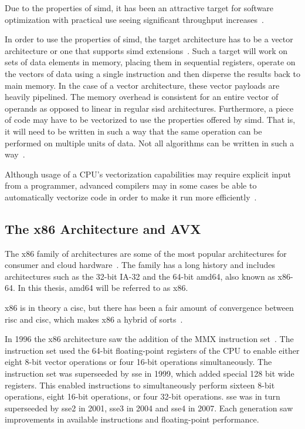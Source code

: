 \noindent Due to the properties of \gls{simd}, it has been an attractive target for software optimization with practical use seeing significant throughput increases~\cite{dickson2011}.

In order to use the properties of \gls{simd}, the target architecture has to be a vector architecture or one that supports \gls{simd} extensions~\cite{hennessy2011:vectorization}. Such a target will work on sets of data elements in memory, placing them in sequential registers, operate on the vectors of data using a single instruction and then disperse the results back to main memory. In the case of a vector architecture, these vector payloads are heavily pipelined. The memory overhead is consistent for an entire vector of operands as opposed to linear in regular \gls{sisd} architectures. Furthermore, a piece of code may have to be vectorized to use the properties offered by \gls{simd}. That is, it will need to be written in such a way that the same operation can be performed on multiple units of data. Not all algorithms can be written in such a way~\cite{dickson2011}.

Although usage of a CPU's vectorization capabilities may require explicit input from a programmer, advanced compilers may in some cases be able to automatically vectorize code in order to make it run more efficiently~\cite{dickson2011}.

\subsection{The x86 Architecture and AVX}

The \gls{x86} family of architectures are some of the most popular architectures for consumer and cloud hardware~\cite{carter2002}. The family has a long history and includes architectures such as the 32-bit IA-32 and the 64-bit amd64, also known as x86-64. In this thesis, amd64 will be referred to as \gls{x86}.

\gls{x86} is in theory a \gls{cisc}, but there has been a fair amount of convergence between \gls{risc} and \gls{cisc}, which makes \gls{x86} a hybrid of sorts~\cite{carter2002}.

In 1996 the \gls{x86} architecture saw the addition of the MMX instruction set~\cite{hennessy2011:avx}. The instruction set used the 64-bit floating-point registers of the CPU to enable either eight 8-bit vector operations or four 16-bit operations simultaneously. The instruction set was superseeded by \gls{sse} in 1999, which added special 128 bit wide registers. This enabled instructions to simultaneously perform sixteen 8-bit operations, eight 16-bit operations, or four 32-bit operations. \gls{sse} was in turn superseeded by \gls{sse}2 in 2001, \gls{sse}3 in 2004 and \gls{sse}4 in 2007. Each generation saw improvements in available instructions and floating-point performance.

